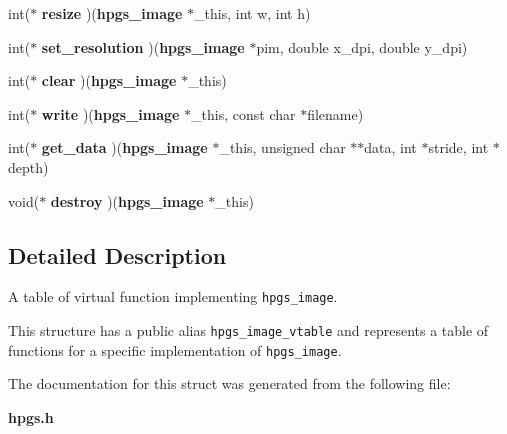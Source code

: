\begin{CompactItemize}
\item 
int($\ast$ \textbf{resize} )({\bf hpgs\_\-image} $\ast$\_\-this, int w, int h)\label{structhpgs__image__vtable__st_b1b3310531a2831373acb9459df372a4}

\item 
int($\ast$ \textbf{set\_\-resolution} )({\bf hpgs\_\-image} $\ast$pim, double x\_\-dpi, double y\_\-dpi)\label{structhpgs__image__vtable__st_d9613cc4a25ec8a2fe272ac8b380bbf0}

\item 
int($\ast$ \textbf{clear} )({\bf hpgs\_\-image} $\ast$\_\-this)\label{structhpgs__image__vtable__st_cccf9768631d2c6ded02d8f2633861bb}

\item 
int($\ast$ \textbf{write} )({\bf hpgs\_\-image} $\ast$\_\-this, const char $\ast$filename)\label{structhpgs__image__vtable__st_034a89fd29ab03949817321634dfe21e}

\item 
int($\ast$ \textbf{get\_\-data} )({\bf hpgs\_\-image} $\ast$\_\-this, unsigned char $\ast$$\ast$data, int $\ast$stride, int $\ast$depth)\label{structhpgs__image__vtable__st_61d55162ee7390120e268f9756f363ec}

\item 
void($\ast$ \textbf{destroy} )({\bf hpgs\_\-image} $\ast$\_\-this)\label{structhpgs__image__vtable__st_4ce669ffc871826e2481dff1e0aa8c4f}

\end{CompactItemize}


\subsection{Detailed Description}
A table of virtual function implementing {\tt hpgs\_\-image}. 

This structure has a public alias {\tt hpgs\_\-image\_\-vtable} and represents a table of functions for a specific implementation of {\tt hpgs\_\-image}. 

The documentation for this struct was generated from the following file:\begin{CompactItemize}
\item 
{\bf hpgs.h}\end{CompactItemize}
